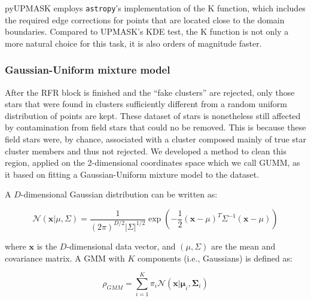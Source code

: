 \documentclass{aa}
\begin{document}
 pyUPMASK employs \texttt{astropy}'s implementation of the K function, which
 includes the required edge corrections for points that are located close to
 the domain boundaries. Compared to UPMASK's KDE test, the K function is not
 only a more natural choice for this task, it is also orders of magnitude
 faster.



\subsubsection{Gaussian-Uniform mixture model}
 \label{sssec:gumm}

 After the RFR block is finished and the ``fake clusters'' are rejected, only
 those stars that were found in clusters sufficiently different from a random
 uniform distribution of points are kept. These dataset of stars is
 nonetheless still affected by contamination from field stars that could no be
 removed. This is because these field stars were, by chance, associated with a
 cluster composed mainly of true star cluster members and thus not rejected.
 We developed a method to clean this region, applied on the 2-dimensional
 coordinates space which we call GUMM, as it based on fitting a
 Gaussian-Uniform mixture model to the dataset.

 A $D$-dimensional Gaussian distribution can be written as:

 \begin{equation}
 \mathcal{N}(\mathbf{x} | \mu, \Sigma)=
 \frac{1}{(2 \pi)^{D / 2}|\Sigma|^{1 / 2}}
 \exp \left(-\frac{1}{2}(\mathbf{x}-\mu)^{T} \Sigma^{-1}(\mathbf{x}-\mu)\right)
 \end{equation}

 \noindent where $\mathbf{x}$ is the $D$-dimensional data vector, and $
 (\mu,\Sigma)$ are the mean and covariance matrix.
 A GMM with $K$ components (i.e., Gaussians) is defined as:

 \begin{equation}
 \rho_{GMM}=\sum_{i=1}^{K} \pi_{i}
 \mathcal{N}\left(\boldsymbol{\mathbf{x} | \mu}_{i}, \boldsymbol{\Sigma}_{i}\right)
 \end{equation}
\end{document}
